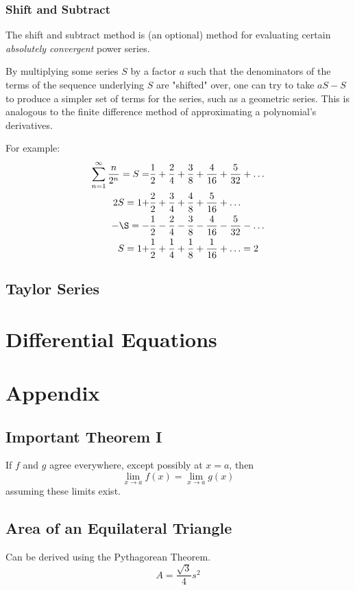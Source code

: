 \documentclass{article}
\begin{document}
\subsubsection{Shift and Subtract}
The shift and subtract method is (an optional) method for evaluating certain \emph{absolutely convergent} power series.

By multiplying some series $S$ by a factor $a$ such that the denominators of the terms of the sequence underlying $S$ are "shifted" over, one can try to take $aS - S$ to produce a simpler set of terms for the series, such as a geometric series. This is analogous to the finite difference method of approximating a polynomial's derivatives.

For example:
\begin{align*}
    \sum_{n=1}^\infty \frac{n}{2^n} = S = &\frac{1}{2} + \frac{2}{4} + \frac{3}{8} + \frac{4}{16} + \frac{5}{32} + \ldots \\
    2S = 1 + &\frac{2}{2} + \frac{3}{4} + \frac{4}{8} + \frac{5}{16} + \ldots \\
    -\S = -&\frac{1}{2} - \frac{2}{4} - \frac{3}{8} - \frac{4}{16} - \frac{5}{32} - \ldots  \\
    S = 1 + &\frac{1}{2} + \frac{1}{4} + \frac{1}{8} + \frac{1}{16} + \ldots = 2
\end{align*}

\subsection{Taylor Series}

\section{Differential Equations}

\section{Appendix}
\subsection{Important Theorem I}
If $f$ and $g$ agree everywhere, except possibly at $x=a$, then \[ \lim_{x \to a} f(x) = \lim_{x \to a} g(x) \]
assuming these limits exist.

\subsection{Area of an Equilateral Triangle}
Can be derived using the Pythagorean Theorem.
$$A = \frac{\sqrt{3}}{4}s^2$$
\end{document}
